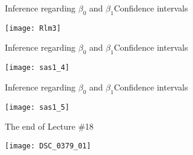 \documentclass[xcolor=dvipsnames]{beamer}
\begin{document}
\begin{frame}{Inference regarding $\beta_0$ and $\beta_1$}{Confidence intervals}
	\begin{center}
		\texttt{[image: Rlm3]}
	\end{center}
\end{frame}

\begin{frame}{Inference regarding $\beta_0$ and $\beta_1$}{Confidence intervals}
	\begin{center}
		\texttt{[image: sas1\_4]}
	\end{center}
\end{frame}

\begin{frame}{Inference regarding $\beta_0$ and $\beta_1$}{Confidence intervals}
	\begin{center}
		\texttt{[image: sas1\_5]}
	\end{center}
\end{frame}

\begin{frame}{The end of Lecture \#18}
	\begin{center}
		\texttt{[image: DSC\_0379\_01]}
	\end{center}
\end{frame}
\end{document}
